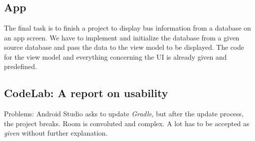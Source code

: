 \chapter{}

\section{App}
The final task is to finish a project to display bus information from a database on an app screen. We have to implement and initialize the database from a given source database and pass the data to the view model to be displayed.
The code for the view model and everything concerning the UI is already given and predefined.


\section{CodeLab: A report on usability}
Problems: Android Studio asks to update \textsl{Gradle}, but after the update process, the project breaks.
Room is convoluted and complex. A lot has to be accepted as \textsl{given} without further explanation.